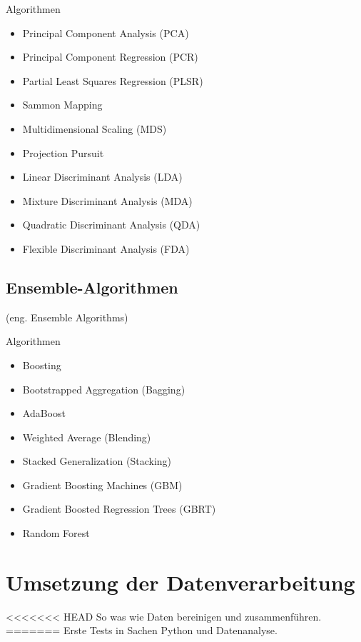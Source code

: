 Algorithmen
\begin{itemize}
	\item Principal Component Analysis (PCA)
	\item Principal Component Regression (PCR)
	\item Partial Least Squares Regression (PLSR)
	\item Sammon Mapping
	\item Multidimensional Scaling (MDS)
	\item Projection Pursuit
	\item Linear Discriminant Analysis (LDA)
	\item Mixture Discriminant Analysis (MDA)
	\item Quadratic Discriminant Analysis (QDA)
	\item Flexible Discriminant Analysis (FDA)
\end{itemize}

\subsection{Ensemble-Algorithmen}
(eng. Ensemble Algorithms)\vspace{0.2cm}

Algorithmen
\begin{itemize}
	\item Boosting
	\item Bootstrapped Aggregation (Bagging)
	\item AdaBoost
	\item Weighted Average (Blending)
	\item Stacked Generalization (Stacking)
	\item Gradient Boosting Machines (GBM)
	\item Gradient Boosted Regression Trees (GBRT)
	\item Random Forest
\end{itemize}


\section{Umsetzung der Datenverarbeitung}
<<<<<<< HEAD
So was wie Daten bereinigen und zusammenführen.
=======
Erste Tests in Sachen Python und Datenanalyse.

